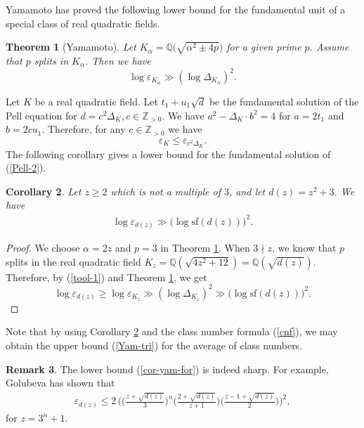 \documentclass[reqno, 11pt, twoside]{amsart}
\numberwithin{equation}{section}
\newtheorem{theorem}{Theorem}[section]
\newtheorem{corollary}[theorem]{Corollary}
\theoremstyle{definition}
\newtheorem{remark}[theorem]{Remark}
\renewcommand{\leq}{\leqslant}
\renewcommand{\geq}{\geqslant}
\newcommand{\eps}{\varepsilon}
\newcommand{\sqf}{\mathrm{sf}}
\newcommand{\QQ}{\mathbb{Q}}
\newcommand{\ZZ}{\mathbb{Z}}
\begin{document}
Yamamoto \cite[Theorem 3.1; Example 4 (I)]{Yam} has proved the following lower bound for the fundamental unit of a special class of real quadratic fields.
\begin{theorem}[Yamamoto]\label{thm-Yam}
   Let $K_\alpha = \QQ \big(\sqrt{\alpha^2 \pm 4p} \big)$ for a given prime $p$. Assume that $p$ splits in $K_\alpha$. Then we have 
$$\log \eps_{K_\alpha} \gg (\log \Delta_{K_\alpha})^2.$$
\end{theorem}

Let $K$ be a real quadratic field. Let $t_1 + u_1 \sqrt{d}$ be the fundamental solution of the Pell equation for $d = c^2 \Delta_K, c \in \ZZ_{>0}$. We have $a^2 - \Delta_K \cdot b^2 = 4$ for $a = 2t_1$ and $b = 2cu_1$. Therefore, for any $c \in \ZZ_{>0}$ we have
\begin{equation}\label{tool-1}
	\eps_K \leq \eps_{c^2 \Delta_K}.
\end{equation}
The following corollary gives a lower bound for the fundamental solution of (\ref{Pell-2}).
\begin{corollary}\label{cor-yam}
	Let $z \geq 2$ which is not a multiple of $3$, and let $d(z) = z^2 + 3$. We have 
\begin{eqnarray}\label{cor-yam-for}
	\log \eps_{d(z)} \gg \big(\log \sqf(d(z))\big)^2.
\end{eqnarray}
\end{corollary}
\begin{proof}
We choose $\alpha = 2z$ and $p = 3$ in Theorem \ref{thm-Yam}. When $3 \nmid z$, we know that $p$ splits in the real quadratic field $K_z = \QQ(\sqrt{4z^2 + 12}) = \QQ(\sqrt{d(z)})$. Therefore, by (\ref{tool-1}) and Theorem \ref{thm-Yam}, we get
	$$\log \eps_{d(z)} \geq \log \eps_{K_z} \gg (\log \Delta_{K_z})^2 \gg \big(\log \sqf(d(z))\big)^2.$$
\end{proof}

Note that by using Corollary \ref{cor-yam} and the class number formula (\ref{cnf}), we may obtain the upper bound (\ref{Yam-tri}) for the average of class numbers.

\begin{remark}
	The lower bound (\ref{cor-yam-for}) is indeed sharp. For example, Golubeva \cite{Gol1} has shown that
	\begin{eqnarray*}
		\eps_{d(z)} \leq 2 \, \bigg( \Big(\frac{z+\sqrt{d(z)}}{3} \Big)^n \Big(\frac{2+\sqrt{d(z)}}{z+1} \Big) \Big(\frac{z-1+\sqrt{d(z)}}{2} \Big) \bigg)^2,
	\end{eqnarray*}
	for $z = 3^n + 1$.
\end{remark}
\end{document}
